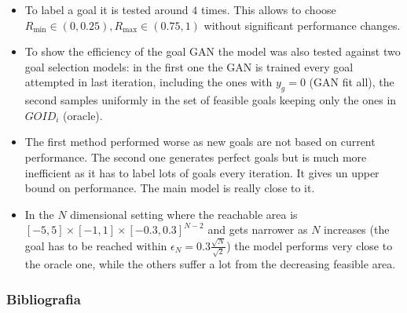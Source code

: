 \documentclass{beamer}
\theoremstyle{plain}
\theoremstyle{definition}
\theoremstyle{remark}
\begin{document}
\begin{frame}
	\begin{itemize}
		\item To label a goal it is tested around $4$ times. This allows to choose $R_{\text{min}}\in(0,0.25), R_{\text{max}}\in(0.75,1)$ without significant performance changes.
		\item To show the efficiency of the goal GAN the model was also tested against two goal selection models: in the first one the GAN is trained every goal attempted in last iteration, including the ones with $y_g=0$ (GAN fit all), the second samples uniformly in the set of feasible goals keeping only the ones in $GOID_i$ (oracle).
		\item The first method performed worse as new goals are not based on current performance. The second one generates perfect goals but is much more inefficient as it has to label lots of goals every iteration. It gives un upper bound on performance. The main model is really close to it.
		\item In the $N$ dimensional setting where the reachable area is $[-5,5]\times [-1,1]\times [-0.3,0.3]^{N-2}$ and gets narrower as $N$ increases (the goal has to be reached within $\epsilon_N=0.3\frac{\sqrt{N}}{\sqrt{2}}$) the model performs very close to the oracle one, while the others suffer a lot from the decreasing feasible area.
	\end{itemize}
\end{frame}

\nocite{AGG}

\begin{frame}[allowframebreaks]
	\frametitle{Bibliografia}
	
	
\end{frame}



\end{document}
